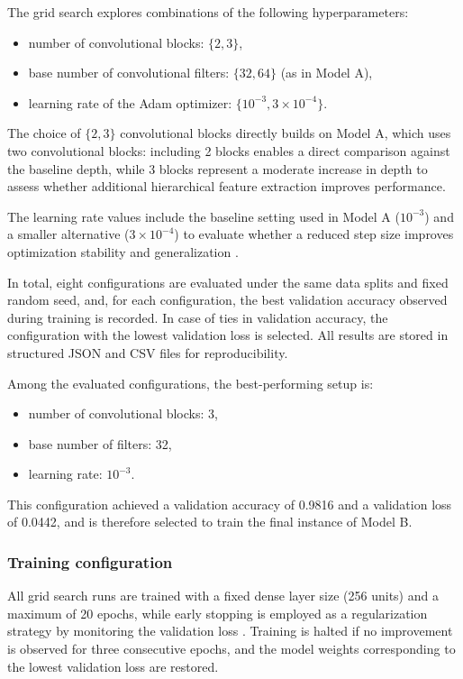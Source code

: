 \documentclass[11pt,a4paper]{article}
\begin{document}
The grid search explores combinations of the following hyperparameters:
\begin{itemize}
    \item number of convolutional blocks: $\{2, 3\}$,
    \item base number of convolutional filters: $\{32, 64\}$ (as in Model A),
    \item learning rate of the Adam optimizer: $\{10^{-3}, 3\times10^{-4}\}$.
\end{itemize}

The choice of $\{2,3\}$ convolutional blocks directly builds on Model A, which uses two convolutional blocks: including 2 blocks enables a direct comparison against the baseline depth, while 3 blocks represent a moderate increase in depth to assess whether additional hierarchical feature extraction improves performance.

The learning rate values include the baseline setting used in Model A ($10^{-3}$) and a smaller alternative ($3\times10^{-4}$) to evaluate whether a reduced step size improves optimization stability and generalization \cite{adam_optimizer_lr}.

In total, eight configurations are evaluated under the same data splits and fixed random seed, and, for each configuration, the best validation accuracy observed during training is recorded.  
In case of ties in validation accuracy, the configuration with the lowest validation loss is selected.  
All results are stored in structured JSON and CSV files for reproducibility.

Among the evaluated configurations, the best-performing setup is:
\begin{itemize}
    \item number of convolutional blocks: 3,
    \item base number of filters: 32,
    \item learning rate: $10^{-3}$.
\end{itemize}
This configuration achieved a validation accuracy of 0.9816 and a validation loss of 0.0442, and is therefore selected to train the final instance of Model B.

\subsubsection{Training configuration}

All grid search runs are trained with a fixed dense layer size (256 units) and a maximum of 20 epochs, while early stopping is employed as a regularization strategy by monitoring the validation loss \cite{keras_early_stopping_callback,keras_callbacks_early_stopping}.  
Training is halted if no improvement is observed for three consecutive epochs, and the model weights corresponding to the lowest validation loss are restored.
\end{document}
